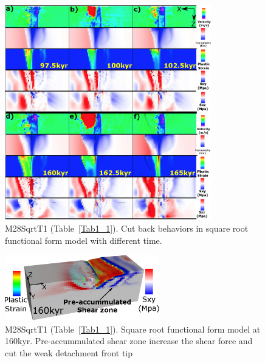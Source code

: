 \begin{figure}[h]
  \centering
    \includegraphics[width=0.8\textwidth]{./Figures/fig_Results4_4_sqrt_cut_back_with_time.eps}
  \caption{M28SqrtT1 (Table~\hyperref[Tab1_1]{\ref{Tab1_1}}). Cut back behaviors in square root functional form model with different time.}
 \label{fig_Results4_4}
\end{figure}   

\begin{figure}[h]
  \centering
    \includegraphics[width=0.6\textwidth]{./Figures/fig_Results4_5_sqrt_cut_back_pre_accummulated_shear_zone.eps}
  \caption{M28SqrtT1 (Table~\hyperref[Tab1_1]{\ref{Tab1_1}}). Square root functional form model at 160kyr. Pre-accummulated shear zone increase the shear force and cut the weak detachment front tip}
 \label{fig_Results4_5}
\end{figure}   

